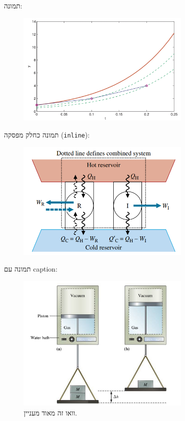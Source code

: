\documentclass[a4paper,]{article}
\begin{document}
תמונה:

\begin{figure}
  \centering
  \includegraphics[width=0.75\textwidth,height=0.4\textheight]{NUM1/NUM1_011/Screenshot_20240322_182502_OneDrive.jpg}
  \caption{}
\end{figure}

תמונה כחלק מפסקה (\texttt{inline}):

\begin{figure}
  \centering
  \includegraphics[width=0.75\textwidth,height=0.4\textheight]{THE1/THE1_005/Pasted image 20240223092520.png}
  \caption{}
\end{figure}

תמונה עם caption:

\begin{figure}
  \centering
  \includegraphics[width=0.75\textwidth,height=0.4\textheight]{GCH1/GCH1_004/Screenshot_20230127_102808_Microsoft 365 (Office).jpg}
  \caption{וואו זה מאוד מעניין.}
\end{figure}
\end{document}

